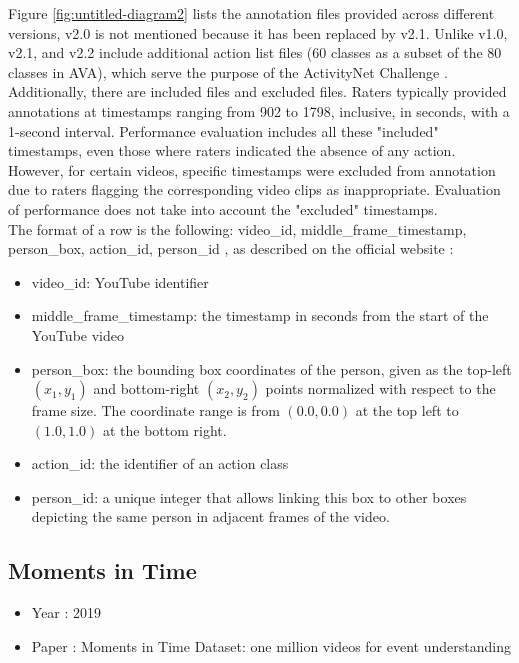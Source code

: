 \documentclass[10pt,onecolumn,letterpaper]{article}
\begin{document}
Figure \ref{fig:untitled-diagram2} lists the annotation files provided across different versions, v2.0 is not mentioned because it has been replaced by v2.1. Unlike v1.0, v2.1, and v2.2 include additional action list files (60 classes as a subset of the 80 classes in AVA), which serve the purpose of the ActivityNet Challenge \cite{ActivityNet}. Additionally, there are included files and excluded files. Raters typically provided annotations at timestamps ranging from 902 to 1798, inclusive, in seconds, with a 1-second interval. Performance evaluation includes all these "included" timestamps, even those where raters indicated the absence of any action. However, for certain videos, specific timestamps were excluded from annotation due to raters flagging the corresponding video clips as inappropriate. Evaluation of performance does not take into account the "excluded" timestamps.\\

The format of a row is the following: video\_id, middle\_frame\_timestamp, person\_box, action\_id, person\_id , as described on the official website :
\begin{itemize}
	\item video\_id: YouTube identifier
	\item middle\_frame\_timestamp: the timestamp in seconds from the start of the YouTube video
	\item person\_box: the bounding box coordinates of the person, given as the top-left $(x_1, y_1)$ and bottom-right $(x_2, y_2)$ points normalized with respect to the frame size. The coordinate range is from $(0.0, 0.0)$ at the top left to $(1.0, 1.0)$ at the bottom right.
	\item action\_id: the identifier of an action class
	\item person\_id: a unique integer that allows linking this box to other boxes depicting the same person in adjacent frames of the video.
\end{itemize}

\subsection{Moments in Time}

\begin{itemize}
	\item Year : 2019
	\item Paper : Moments in Time Dataset: one million videos for event understanding \cite{momentsintime}
\end{itemize}
\end{document}
